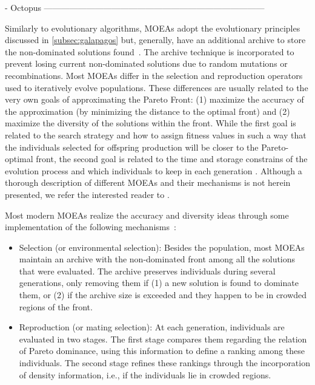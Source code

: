 - Octopus ------------------------------------------------------------------------------

Similarly to evolutionary algorithms, \acp{MOEA} adopt the evolutionary principles discussed in \cref{subsec:galapagos} but, generally, have an additional archive to store the non-dominated solutions found~\cite{Zitzler2001SPEA2}. The archive technique is incorporated to prevent losing current non-dominated solutions due to random mutations or recombinations. Most \acp{MOEA} differ in the selection and reproduction operators used to iteratively evolve populations. These differences are usually related to the very own goals of approximating the Pareto Front: (1) maximize the accuracy of the approximation (by minimizing the distance to the optimal front) and (2) maximize the diversity of the solutions within the front. While the first goal is related to the search strategy and how to assign fitness values in such a way that the individuals selected for offspring production will be closer to the Pareto-optimal front, the second goal is related to the time and storage constrains of the evolution process and which individuals to keep in each generation \cite{Zitzler2001SPEA2}. Although a thorough description of different \acp{MOEA} and their mechanisms is not herein presented, we refer the interested reader to \cite{Zhou2011}. 

Most modern \acp{MOEA} realize the accuracy and diversity ideas through some implementation of the following mechanisms~\cite{Zitzler2001SPEA2}:	
\begin{itemize}
	\item Selection (or environmental selection): Besides the population, most \acp{MOEA} maintain an archive with the non-dominated front among all the solutions that were evaluated. The archive preserves individuals during several generations, only removing them if (1) a new solution is found to dominate them, or (2) if the archive size is exceeded and they happen to be in crowded regions of the front.
	
	\item Reproduction (or mating selection): At each generation, individuals are evaluated in two stages. The first stage compares them regarding the relation of Pareto dominance, using this information to define a ranking among these individuals. The second stage refines these rankings through the incorporation of density information, i.e., if the individuals lie in crowded regions.
\end{itemize}

